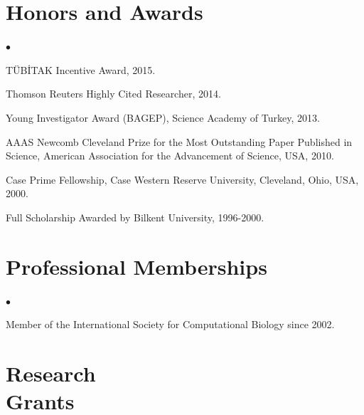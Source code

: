 \documentclass[margin,line]{res}
\newenvironment{list2}{
  \begin{list}{$\bullet$}{%
      \setlength{\itemsep}{0in}
      \setlength{\parsep}{0in} \setlength{\parskip}{0in}
      \setlength{\topsep}{0in} \setlength{\partopsep}{0in} 
      \setlength{\leftmargin}{0.2in}}}{\end{list}}
\newcommand{\junk}[1]{}
\begin{document}
\begin{resume}
          \section{\sc Honors and Awards} 
          \begin{list2}
            \junk{
            \item
              Ranked 36$^{th}$ among 1.2 million examinees in the Nationwide University
              Entrance Examinations in ~Turkey, 1996.
            \item
              Ranked 40$^{th}$ in the Nationwide Post-Graduate Education Examination in Turkey, 1999.
            }
          \item
            TÜBİTAK Incentive Award, 2015.
          \item
            Thomson Reuters Highly Cited Researcher, 2014.
          \item
            Young Investigator Award (BAGEP), Science Academy of Turkey, 2013.
          \item
            AAAS Newcomb Cleveland Prize for the Most Outstanding Paper Published in Science, American Association for the Advancement of Science, USA, 2010.
          \item
            Case Prime Fellowship, Case Western Reserve University, Cleveland, Ohio, USA, 2000.
          \item
            Full Scholarship Awarded by Bilkent University, 1996-2000.
          \end{list2}
          

\vspace*{-.2cm}
\section{\sc Professional Memberships}
\begin{list2}
\item 
  Member of the International Society for Computational Biology since 2002.
\end{list2}

\clearpage

          \section{\sc Research \\ Grants}
                                       \vspace{-0.4cm}

\end{resume}
\end{document}
